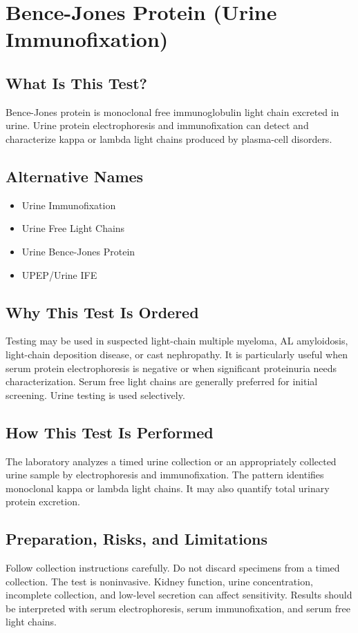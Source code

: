 \chapter{Bence-Jones Protein (Urine Immunofixation)}

\section*{What Is This Test?}
Bence-Jones protein is monoclonal free immunoglobulin light chain excreted in urine. Urine protein electrophoresis and immunofixation can detect and characterize kappa or lambda light chains produced by plasma-cell disorders.

\section*{Alternative Names}
\begin{itemize}
  \item Urine Immunofixation
  \item Urine Free Light Chains
  \item Urine Bence-Jones Protein
  \item UPEP/Urine IFE
\end{itemize}
\section*{Why This Test Is Ordered}
Testing may be used in suspected light-chain multiple myeloma, AL amyloidosis, light-chain deposition disease, or cast nephropathy. It is particularly useful when serum protein electrophoresis is negative or when significant proteinuria needs characterization. Serum free light chains are generally preferred for initial screening. Urine testing is used selectively.

\section*{How This Test Is Performed}
The laboratory analyzes a timed urine collection or an appropriately collected urine sample by electrophoresis and immunofixation. The pattern identifies monoclonal kappa or lambda light chains. It may also quantify total urinary protein excretion.

\section*{Preparation, Risks, and Limitations}
Follow collection instructions carefully. Do not discard specimens from a timed collection. The test is noninvasive. Kidney function, urine concentration, incomplete collection, and low-level secretion can affect sensitivity. Results should be interpreted with serum electrophoresis, serum immunofixation, and serum free light chains.


